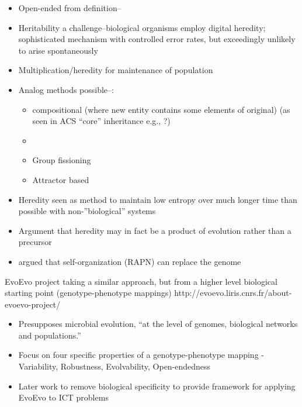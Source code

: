 \begin{itemize}
	\item
	Open-ended from \autocite{MaynardSmith1999} definition--
	\item
	Heritability a challenge--biological organisms employ digital
	heredity; sophisticated mechanism with controlled error rates, but
	exceedingly unlikely to arise spontaneously
	\item
	Multiplication/heredity for maintenance of population
	\item
	Analog methods possible--\eg:
	
	\begin{itemize}
		\item
		compositional (where new entity contains some elements of original)
		(as seen in ACS ``core'' inheritance e.g., \autocite{Vasas2015, Watson2012}?)
		\item
		\item
		Group fissioning \autocite{Watson2015}
		\item
		Attractor based \autocite{Szathmary2000}
	\end{itemize}
	\item
	Heredity seen as method to maintain low entropy over much longer time
	than possible with non-''biological'' systems \autocite{Adami2015}
	\item
	Argument that heredity may in fact be a product of evolution rather than a precursor \autocite{Bourrat2015}
	\item
	\autocite{Kauffman:1993kk} argued that self-organization (RAPN) can replace the genome
\end{itemize}

EvoEvo project taking a similar approach, but from a higher level biological starting point (genotype-phenotype mappings)
http://evoevo.liris.cnrs.fr/about-evoevo-project/

\begin{itemize}
	\item Presupposes microbial evolution, ``at the level of genomes, biological networks and populations.''
	\item Focus on four specific properties of a genotype-phenotype mapping - Variability, Robustness, Evolvability, Open-endedness
	\item Later work to remove biological specificity to provide framework for applying EvoEvo to ICT problems
\end{itemize}

